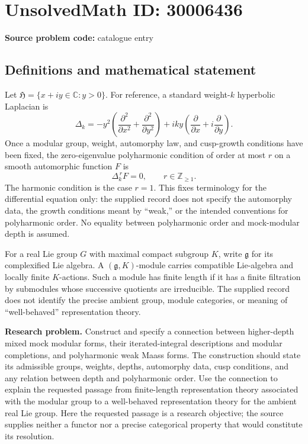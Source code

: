 \documentclass[11pt]{article}
\newcommand{\Z}{\mathbb{Z}}
\newcommand{\C}{\mathbb{C}}
\begin{document}
\section*{UnsolvedMath ID: 30006436}
\textbf{Source problem code:} catalogue entry
\subsection{Definitions and mathematical statement}
Let \(\mathfrak H=\{x+iy\in\C:y>0\}\). For reference, a standard weight-\(k\) hyperbolic Laplacian is
\[
\Delta_k=-y^2\left(\frac{\partial^2}{\partial x^2}+\frac{\partial^2}{\partial y^2}\right)+iky\left(\frac{\partial}{\partial x}+i\frac{\partial}{\partial y}\right).
\]
Once a modular group, weight, automorphy law, and cusp-growth conditions have been fixed, the zero-eigenvalue polyharmonic condition of order at most \(r\) on a smooth automorphic function \(F\) is
\[
\Delta_k^{\,r}F=0,\qquad r\in\Z_{\geq 1}.
\]
The harmonic condition is the case \(r=1\). This fixes terminology for the differential equation only: the supplied record does not specify the automorphy data, the growth conditions meant by ``weak,'' or the intended conventions for polyharmonic order. No equality between polyharmonic order and mock-modular depth is assumed.

For a real Lie group \(G\) with maximal compact subgroup \(K\), write \(\mathfrak g\) for its complexified Lie algebra. A \((\mathfrak g,K)\)-module carries compatible Lie-algebra and locally finite \(K\)-actions. Such a module has finite length if it has a finite filtration by submodules whose successive quotients are irreducible. The supplied record does not identify the precise ambient group, module categories, or meaning of ``well-behaved'' representation theory.

\textbf{Research problem.} Construct and specify a connection between higher-depth mixed mock modular forms, their iterated-integral descriptions and modular completions, and polyharmonic weak Maass forms. The construction should state its admissible groups, weights, depths, automorphy data, cusp conditions, and any relation between depth and polyharmonic order. Use the connection to explain the requested passage from finite-length representation theory associated with the modular group to a well-behaved representation theory for the ambient real Lie group. Here the requested passage is a research objective; the source supplies neither a functor nor a precise categorical property that would constitute its resolution.
\end{document}
